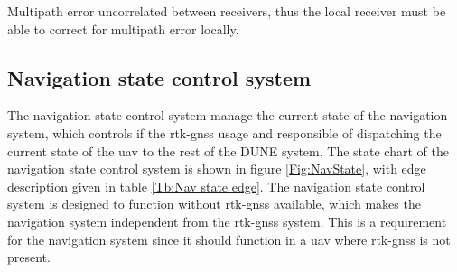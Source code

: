 Multipath error uncorrelated between receivers, thus the local receiver must be able to correct for multipath error locally.

\subsection{Navigation state control system}\label{S:NavState}
The navigation state control system manage the current state of the navigation system, which controls if the \gls{rtk-gnss} usage and responsible of dispatching the current state of the \gls{uav} to the rest of the DUNE system. The state chart of the navigation state control system is shown in figure \ref{Fig:NavState}, with edge description given in table \ref{Tb:Nav state edge}. The navigation state control system is designed to function without \gls{rtk-gnss} available, which makes the navigation system independent from the \gls{rtk-gnss} system. This is a requirement for the navigation system since it should function in a \gls{uav} where \gls{rtk-gnss} is not present.

